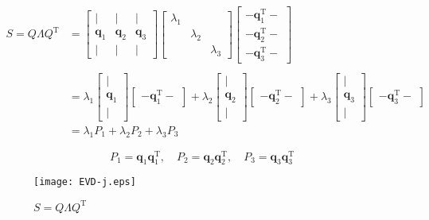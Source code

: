 \documentclass[letterpaper]{article}
\DeclareRobustCommand\transp{^{\mathrm{T}}}
\begin{document}
\begin{align*}
  S = Q \Lambda Q\transp
&= \begin{bmatrix}
    | & | & |\\
    \bm{q}_1 & \bm{q}_2 & \bm{q}_3\\
    | & | & |
  \end{bmatrix}
  \begin{bmatrix}
    \lambda_1 \\
           & \lambda_2 & \\
           & & \lambda_3
  \end{bmatrix}
  \begin{bmatrix}
  - \bm{q}_1\transp -\\
  - \bm{q}_2\transp -\\
  - \bm{q}_3\transp -
  \end{bmatrix}\\
  \\
  &=
  \lambda_1 \begin{bmatrix}
    |\\
    \bm{q}_1\\
    |
  \end{bmatrix}
  \begin{bmatrix}
    - \bm{q}_1\transp - 
  \end{bmatrix}
  +
  \lambda_2 \begin{bmatrix}
  |\\
  \bm{q}_2\\
  |
  \end{bmatrix}
  \begin{bmatrix}
  - \bm{q}_2\transp -
  \end{bmatrix} 
  +
  \lambda_3 \begin{bmatrix}
    |\\
    \bm{q}_3 \\
    |
  \end{bmatrix}
  \begin{bmatrix}
    - \bm{q}_3\transp -
  \end{bmatrix} \\
&= \lambda_1 P_1 + \lambda_2 P_2 + \lambda_3 P_3
\end{align*}

\begin{equation*}
  P_1=\bm{q}_1 \bm{q}_1\transp, \quad P_2=\bm{q}_2 \bm{q}_2\transp, \quad P_3=\bm{q}_3 \bm{q}_3\transp
\end{equation*}


\begin{figure}[H]
  \centering
  \texttt{[image: EVD-j.eps]}
  \caption{$S=Q \Lambda Q\transp$}
\end{figure}
\end{document}
